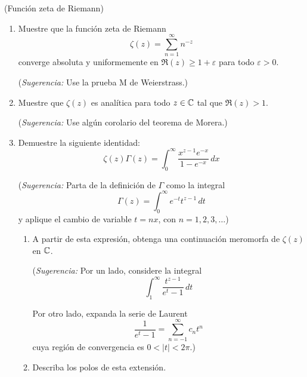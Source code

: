 \begin{exercise}
(Función zeta de Riemann)
\begin{enumerate}[label=\alph*)]
    \item Muestre que la función zeta de Riemann
    $$\zeta(z) = \sum_{n=1}^\infty n^{-z}$$
    converge absoluta y uniformemente en $\Re(z) \ge 1 + \varepsilon$ para todo $\varepsilon > 0$.
    
    (\textit{Sugerencia:} Use la prueba M de Weierstrass.)
    
    \item Muestre que $\zeta(z)$ es analítica para todo $z \in \mathbb C$ tal que $\Re(z) > 1$.
    
    (\textit{Sugerencia:} Use algún corolario del teorema de Morera.)
    
    \item Demuestre la siguiente identidad:
    $$\zeta(z) \Gamma(z) = \int_0^\infty \frac {x^{z-1} e^{-x}} {1 - e^{-x}} \, dx$$
    
    (\textit{Sugerencia:} Parta de la definición de $\Gamma$ como la integral
    $$\Gamma(z) = \int_0^\infty e^{-t} t^{z-1} \, dt$$
    y aplique el cambio de variable $t = nx$, con $n = 1, 2, 3, \dots$)
    
    \begin{enumerate}[label=\arabic*)]
        \item A partir de esta expresión, obtenga una continuación meromorfa de $\zeta(z)$ en $\mathbb C$.
        
        (\textit{Sugerencia:} Por un lado, considere la integral
        $$\int_1^\infty \frac {t^{z-1}} {e^t - 1} \, dt$$
        
        Por otro lado, expanda la serie de Laurent
        $$\frac 1 {e^t - 1} = \sum_{n=-1}^\infty c_n t^n$$
        cuya región de convergencia es $0 < |t| < 2\pi$.)
        
        \item Describa los polos de esta extensión.
    \end{enumerate}
\end{enumerate}
\end{exercise}


